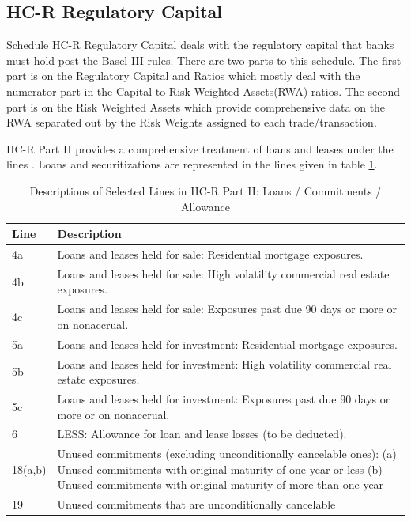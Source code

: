 \documentclass[conference]{IEEEtran}
\begin{document}
\subsection{HC-R Regulatory Capital}
    Schedule HC-R Regulatory Capital deals with the regulatory capital that banks must hold post the Basel III rules. There are two parts to this schedule. The first part is on the Regulatory Capital and Ratios which mostly deal with the numerator part in the Capital to Risk Weighted Assets(RWA) ratios. The second part is on the Risk Weighted Assets which provide comprehensive data on the RWA separated out by the Risk Weights assigned to each trade/transaction.
    
    HC-R Part II provides a comprehensive treatment of loans and leases under the lines . Loans and securitizations are represented in the lines given in table \ref{HCR descriptions}.
    
   \begin{table}[htbp]
   	\centering
   	\caption{Descriptions of Selected Lines in HC-R Part II: Loans / Commitments / Allowance}
   	\label{HCR descriptions}
   	\begin{tabular}{|p{1.5cm}|p{5.5cm}|}
   		\hline
   		\textbf{Line} & \textbf{Description} \\
   		\hline
   		4a & Loans and leases held for sale: Residential mortgage exposures. \\
   		\hline
   		4b & Loans and leases held for sale: High volatility commercial real estate exposures. \\
   		\hline
   		4c & Loans and leases held for sale: Exposures past due 90 days or more or on nonaccrual. \\
   		\hline
   		5a & Loans and leases held for investment: Residential mortgage exposures. \\
   		\hline
   		5b & Loans and leases held for investment: High volatility commercial real estate exposures. \\
   		\hline
   		5c & Loans and leases held for investment: Exposures past due 90 days or more or on nonaccrual. \\
   		\hline
   		6 & LESS: Allowance for loan and lease losses (to be deducted). \\
   		\hline
   		18(a,b) & Unused commitments (excluding unconditionally cancelable ones):  
   		\newline 18(a) Unused commitments with original maturity of one year or less  
   		\newline 18(b) Unused commitments with original maturity of more than one year \\
   		\hline
   		19 & Unused commitments that are unconditionally cancelable \\
   		\hline
   	\end{tabular}
   \end{table}
   
\end{document}
